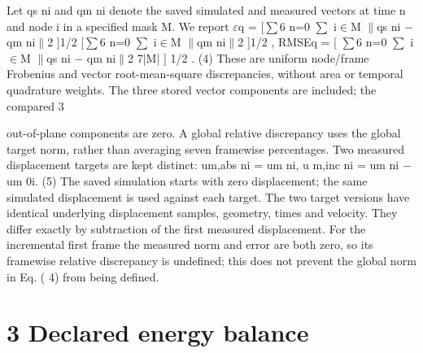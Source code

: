 \documentclass[11pt]{article}
\begin{document}
Let qs
ni and qm
ni denote the saved simulated and measured vectors at time n and node i in a specified
mask M. We report
\ensuremath{\varepsilon}q =
[\ensuremath{\sum}6
n=0
\ensuremath{\sum}
i\ensuremath{\in}M \ensuremath{\parallel}qs
ni \ensuremath{-} qm
ni\ensuremath{\parallel}2
]1/2
[\ensuremath{\sum}6
n=0
\ensuremath{\sum}
i\ensuremath{\in}M \ensuremath{\parallel}qm
ni\ensuremath{\parallel}2
]1/2 , RMSEq =
[ \ensuremath{\sum}6
n=0
\ensuremath{\sum}
i\ensuremath{\in}M \ensuremath{\parallel}qs
ni \ensuremath{-} qm
ni\ensuremath{\parallel}2
7|M|
] 1/2
. (4)
These are uniform node/frame Frobenius and vector root-mean-square discrepancies, without area
or temporal quadrature weights. The three stored vector components are included; the compared
3

out-of-plane components are zero. A global relative discrepancy uses the global target norm, rather
than averaging seven framewise percentages.
Two measured displacement targets are kept distinct:
um,abs
ni = um
ni, u m,inc
ni = um
ni \ensuremath{-} um
0i. (5)
The saved simulation starts with zero displacement; the same simulated displacement is used against
each target. The two target versions have identical underlying displacement samples, geometry,
times and velocity. They differ exactly by subtraction of the first measured displacement. For
the incremental first frame the measured norm and error are both zero, so its framewise relative
discrepancy is undefined; this does not prevent the global norm in Eq. ( 4) from being defined.

\section*{3 Declared energy balance}
\end{document}
